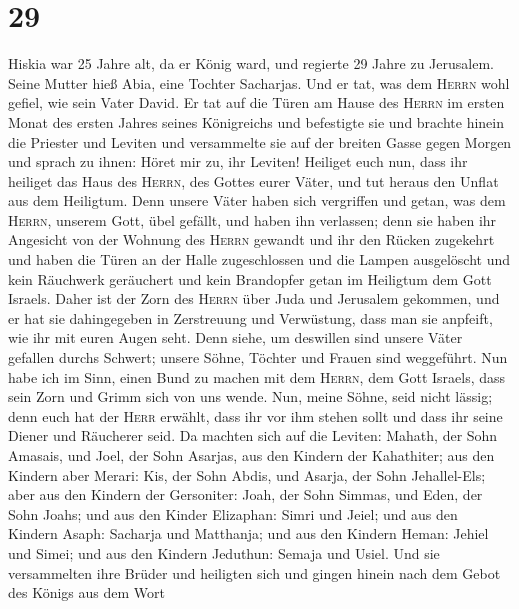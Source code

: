 \hypertarget{section-28}{%
\section{29}\label{section-28}}

 Hiskia war 25 Jahre alt, da er König ward, und regierte
29 Jahre zu Jerusalem. Seine Mutter hieß Abia, eine Tochter Sacharjas.
 Und er tat, was dem \textsc{Herrn} wohl gefiel, wie sein
Vater David.  Er tat auf die Türen am Hause des
\textsc{Herrn} im ersten Monat des ersten Jahres seines Königreichs und
befestigte sie  und brachte hinein die Priester und
Leviten und versammelte sie auf der breiten Gasse gegen Morgen
 und sprach zu ihnen: Höret mir zu, ihr Leviten! Heiliget
euch nun, dass ihr heiliget das Haus des \textsc{Herrn}, des Gottes
eurer Väter, und tut heraus den Unflat aus dem Heiligtum. 
Denn unsere Väter haben sich vergriffen und getan, was dem
\textsc{Herrn}, unserem Gott, übel gefällt, und haben ihn verlassen;
denn sie haben ihr Angesicht von der Wohnung des \textsc{Herrn} gewandt
und ihr den Rücken zugekehrt  und haben die Türen an der
Halle zugeschlossen und die Lampen ausgelöscht und kein Räuchwerk
geräuchert und kein Brandopfer getan im Heiligtum dem Gott Israels.
 Daher ist der Zorn des \textsc{Herrn} über Juda und
Jerusalem gekommen, und er hat sie dahingegeben in Zerstreuung und
Verwüstung, dass man sie anpfeift, wie ihr mit euren Augen seht.
 Denn siehe, um deswillen sind unsere Väter gefallen
durchs Schwert; unsere Söhne, Töchter und Frauen sind weggeführt.
 Nun habe ich im Sinn, einen Bund zu machen mit dem
\textsc{Herrn}, dem Gott Israels, dass sein Zorn und Grimm sich von uns
wende.  Nun, meine Söhne, seid nicht lässig; denn euch
hat der \textsc{Herr} erwählt, dass ihr vor ihm stehen sollt und dass
ihr seine Diener und Räucherer seid.  Da machten sich auf
die Leviten: Mahath, der Sohn Amasais, und Joel, der Sohn Asarjas, aus
den Kindern der Kahathiter; aus den Kindern aber Merari: Kis, der Sohn
Abdis, und Asarja, der Sohn Jehallel-Els; aber aus den Kindern der
Gersoniter: Joah, der Sohn Simmas, und Eden, der Sohn Joahs;
 und aus den Kinder Elizaphan: Simri und Jeiel; und aus
den Kindern Asaph: Sacharja und Matthanja;  und aus den
Kindern Heman: Jehiel und Simei; und aus den Kindern Jeduthun: Semaja
und Usiel.  Und sie versammelten ihre Brüder und
heiligten sich und gingen hinein nach dem Gebot des Königs aus dem Wort
